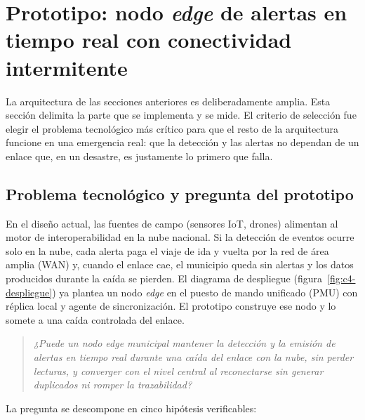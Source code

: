 \section{Prototipo: nodo \emph{edge} de alertas en tiempo real con conectividad intermitente}
\label{sec:prototipo}

La arquitectura de las secciones anteriores es deliberadamente amplia. Esta
sección delimita la parte que se implementa y se mide. El criterio de selección
fue elegir el problema tecnológico más crítico para que el resto de la
arquitectura funcione en una emergencia real: que la detección y las alertas no
dependan de un enlace que, en un desastre, es justamente lo primero que falla.

\subsection{Problema tecnológico y pregunta del prototipo}

En el diseño actual, las fuentes de campo (sensores IoT, drones) alimentan al
motor de interoperabilidad en la nube nacional. Si la detección de eventos
ocurre solo en la nube, cada alerta paga el viaje de ida y vuelta por la red
de área amplia (WAN) y, cuando el enlace cae, el municipio queda sin alertas y
los datos producidos durante la caída se pierden. El diagrama de despliegue
(figura~\ref{fig:c4-despliegue}) ya plantea un nodo \emph{edge} en el puesto de
mando unificado (PMU) con réplica local y agente de sincronización. El
prototipo construye ese nodo y lo somete a una caída controlada del enlace.

\begin{quote}
\itshape
¿Puede un nodo \emph{edge} municipal mantener la detección y la emisión de
alertas en tiempo real durante una caída del enlace con la nube, sin perder
lecturas, y converger con el nivel central al reconectarse sin generar
duplicados ni romper la trazabilidad?
\end{quote}

La pregunta se descompone en cinco hipótesis verificables:

